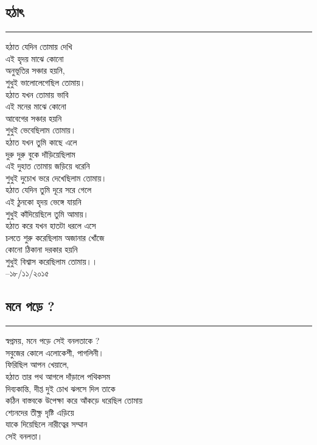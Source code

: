 \documentclass[12pt]{article}
\begin{document}
\subsection*{হঠাৎ }
\hrule
\vspace{1in}
হঠাত যেদিন তোমায় দেখি\\
এই হৃদয় মাঝে কোনো\\
অনুভূতির সঞ্চার হয়নি,\\
শুধুই ভালোলেগেছিল তোমায়।\\

\noindent
হঠাত যখন তোমায় ভাবি\\
এই মনের মাঝে কোনো\\
আবেগের সঞ্চার হয়নি\\
শুধুই ভেবেছিলাম তোমায়।\\

\noindent
হঠাত যখন তুমি কাছে এলে\\
দুরু দুরু বুকে দাঁড়িয়েছিলাম\\
এই দুহাত তোমায় জড়িয়ে ধরেনি\\
শুধুই দুচোখ ভরে দেখেছিলাম তোমায়।\\

\noindent
হঠাত যেদিন তুমি দূরে সরে গেলে\\
এই ঠুনকো হৃদয় ভেঙ্গে যায়নি\\
শুধুই কাঁদিয়েছিলে তুমি আমায়।\\

\noindent
হঠাত করে যখন হাতটা ধরলে এসে\\
চলতে শুরু করেছিলাম অজানার খোঁজে\\
কোনো ঠিকানা দরকার হয়নি\\
শুধুই বিশ্বাস করেছিলাম তোমায়।।\\

--১৮/১১/২০১৫
\newpage

\subsection*{মনে পড়ে ? }
\hrule
\vspace{1in}
স্বপ্নময়, মনে পড়ে সেই বনলতাকে ?\\
সবুজের কোলে এলোকেশী, পাগলিনী।\\
ফিরিছিল আপন খেয়ালে,\\
হঠাত তার পথ আগলে দাঁড়ালে পথিকসম\\
দিব্যকান্তি, দীপ্ত দুই চোখ ঝলসে দিল তাকে\\
কঠিন বাস্তবকে উপেক্ষা করে আঁকড়ে ধরেছিল তোমায়\\
শ্যেনদের তীক্ষ্ণ দৃষ্টি এড়িয়ে\\
যাকে দিয়েছিলে নারীত্বের সম্মান\\
সেই বনলতা।\\
\end{document}
